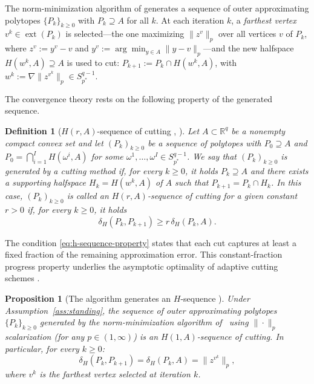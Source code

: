 \documentclass[11pt]{article}
\newtheorem{proposition}[theorem]{Proposition}
\newtheorem{definition}{Definition}
\newcommand{\R}{\mathbb{R}}
\DeclareMathOperator{\ext}{ext}
\newcommand{\pstar}{p^*}
\begin{document}
The norm-minimization algorithm of \cite{Ararat2022} generates a sequence of outer approximating polytopes $\{P_k\}_{k \ge 0}$ with $P_k \supseteq A$ for all $k$. At each iteration $k$, a \emph{farthest vertex} $v^k \in \ext(P_k)$ is selected---the one maximizing $\|z^v\|_p$ over all vertices $v$ of $P_k$, where $z^v := y^v - v$ and $y^v := \arg\min_{y \in A} \|y - v\|_p$---and the new halfspace $H(w^k, A) \supseteq A$ is used to cut: $P_{k+1} := P_k \cap H(w^k, A)$, with $w^k := \nabla\|z^{v^k}\|_p \in S_{\pstar}^{q-1}$.

The convergence theory rests on the following property of the generated sequence.

\begin{definition}[$H(r,A)$-sequence of cutting {\cite[Definition~8.3]{Lotov2004}, \cite[Definition~6.2]{Ararat2024}}]\label{def:h-sequence}
Let $A \subset \R^q$ be a nonempty compact convex set and let $(P_k)_{k \ge 0}$ be a sequence of polytopes with $P_0 \supseteq A$ and $P_0 = \bigcap_{i=1}^{I} H(\omega^i, A)$ for some $\omega^1, \ldots, \omega^I \in S_{\pstar}^{q-1}$. We say that $(P_k)_{k \ge 0}$ is generated by a \emph{cutting method} if, for every $k \ge 0$, it holds $P_k \supseteq A$ and there exists a supporting halfspace $H_k = H(w^k, A)$ of $A$ such that $P_{k+1} = P_k \cap H_k$. In this case, $(P_k)_{k \ge 0}$ is called an $H(r, A)$-sequence of cutting for a given constant $r > 0$ if, for every $k \ge 0$, it holds
\begin{equation}\label{eq:h-sequence-property}
\delta_H(P_k, P_{k+1}) \ge r\,\delta_H(P_k, A).
\end{equation}
\end{definition}

The condition \eqref{eq:h-sequence-property} states that each cut captures at least a fixed fraction of the remaining approximation error. This constant-fraction progress property underlies the asymptotic optimality of adaptive cutting schemes \cite[Section~5]{Lotov2004}.

\begin{proposition}[The algorithm generates an $H$-sequence {\cite[Corollary~6.5]{Ararat2024}}]\label{prop:algorithm-h-sequence}
Under Assumption~\ref{ass:standing}, the sequence of outer approximating polytopes $\{P_k\}_{k \ge 0}$ generated by the norm-minimization algorithm of~\cite{Ararat2022} using $\|\cdot\|_p$ scalarization (for any $p \in (1,\infty)$) is an $H(1, A)$-sequence of cutting. In particular, for every $k \ge 0$:
\begin{equation}\label{eq:hausdorff-step}
\delta_H(P_k, P_{k+1}) = \delta_H(P_k, A) = \|z^{v^k}\|_p,
\end{equation}
where $v^k$ is the farthest vertex selected at iteration $k$.
\end{proposition}
\end{document}
